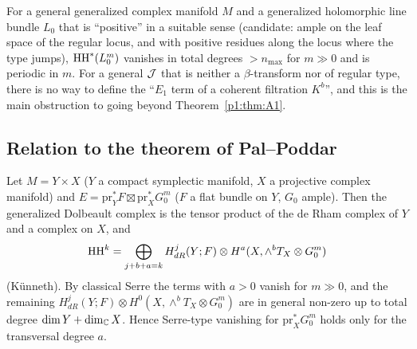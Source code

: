 \begin{conj}\tK\label{p1:conj:A3}
For a general generalized complex manifold $M$ and a generalized holomorphic line bundle $L_0$ that is ``positive'' in a suitable sense (candidate: ample on the leaf space of the regular locus, and with positive residues along the locus where the type jumps), $\mathrm{HH}^*(L_0^m)$ vanishes in total degrees $>n_{\max}$ for $m\gg0$ and is periodic in $m$. For a general $\mathcal J$ that is neither a $\beta$-transform nor of regular type, there is no way to define the ``$E_1$ term of a coherent filtration $K^b$'', and this is the main obstruction to going beyond Theorem~\ref{p1:thm:A1}.
\end{conj}

\subsection{Relation to the theorem of Pal--Poddar}
\begin{prop}\tP\label{p1:prop:PPprod}
Let $M=Y\times X$ ($Y$ a compact symplectic manifold, $X$ a projective complex manifold) and $E=\mathrm{pr}_Y^*F\boxtimes\mathrm{pr}_X^*G_0^m$ ($F$ a flat bundle on $Y$, $G_0$ ample). Then the generalized Dolbeault complex is the tensor product of the de Rham complex of $Y$ and a complex on $X$, and
\[\mathrm{HH}^k=\bigoplus_{j+b+a=k}H^j_{dR}(Y;F)\otimes H^a(X,\wedge^bT_X\otimes G_0^m)\]
(K\"unneth). By classical Serre the terms with $a>0$ vanish for $m\gg0$, and the remaining $H^j_{dR}(Y;F)\otimes H^0(X,\wedge^bT_X\otimes G_0^m)$ are in general non-zero up to total degree $\dim Y+\dim_\mathbb C X$. Hence Serre-type vanishing for $\mathrm{pr}_X^*G_0^m$ holds only for the transversal degree $a$.
\end{prop}
